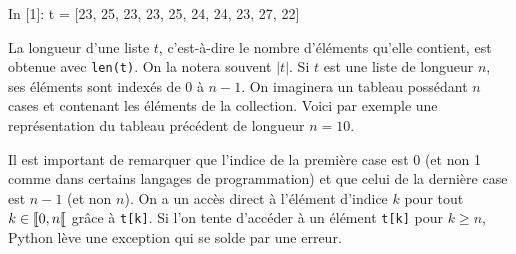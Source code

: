 \documentclass{magnolia}
\begin{document}
\begin{pythoncode}
In [1]: t = [23, 25, 23, 23, 25, 24, 24, 23, 27, 22]
\end{pythoncode}
\noindent
La longueur d'une liste $t$, c'est-à-dire le nombre d'éléments qu'elle contient,
est obtenue avec \verb!len(t)!. On la notera souvent $|t|$. Si $t$ est une liste de longueur
$n$, ses éléments sont indexés de 0 à $n-1$. On imaginera un tableau possédant $n$ cases
et contenant les éléments de la collection. Voici par exemple une représentation du tableau
précédent de longueur $n=10$.
\begin{center}
\end{center}
Il est important de remarquer que l'indice de la première case est 0 (et non 1 comme dans certains langages de programmation) et que celui de la
dernière case est $n-1$ (et non $n$). On a un accès direct à l'élément d'indice $k$ 
pour tout $k\in\left\llbracket 0,n\right\llbracket$ grâce à \verb!t[k]!. Si l'on tente d'accéder à un élément \verb!t[k]! pour $k\geq n$,
Python lève une exception qui se solde par une erreur.\\
\end{document}
